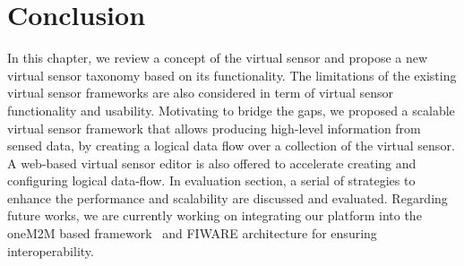 \section{Conclusion}
In this chapter, we review a concept of the virtual sensor and propose a new virtual sensor taxonomy based on its functionality. The limitations of the existing virtual sensor frameworks are also considered in term of virtual sensor functionality and usability. Motivating to bridge the gaps, we proposed a scalable virtual sensor framework that allows producing high-level information from sensed data, by creating a logical data flow over a collection of the virtual sensor. A web-based virtual sensor editor is also offered to accelerate creating and configuring logical data-flow. In evaluation section, a serial of strategies to enhance the performance and scalability are discussed and evaluated. Regarding future works, we are currently working on integrating our platform into the oneM2M based framework~\cite{DattaGyrardBonnetBoudaoud2015} and FIWARE  architecture for ensuring interoperability.

